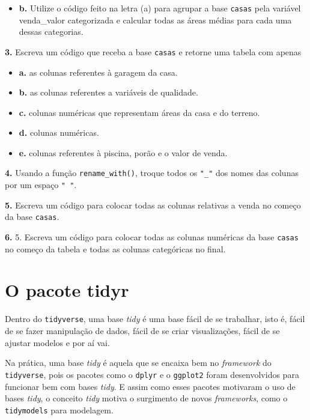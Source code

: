 \documentclass[
]{book}
\providecommand{\tightlist}{%
  \setlength{\itemsep}{0pt}\setlength{\parskip}{0pt}}
\begin{document}
\begin{itemize}
\tightlist
\item
  \textbf{b.} Utilize o código feito na letra (a) para agrupar a base \texttt{casas} pela variável venda\_valor categorizada e calcular todas as áreas médias para cada uma dessas categorias.
\end{itemize}

\textbf{3.} Escreva um código que receba a base \texttt{casas} e retorne uma tabela com apenas

\begin{itemize}
\item
  \textbf{a.} as colunas referentes à garagem da casa.
\item
  \textbf{b.} as colunas referentes a variáveis de qualidade.
\item
  \textbf{c.} colunas numéricas que representam áreas da casa e do terreno.
\item
  \textbf{d.} colunas numéricas.
\item
  \textbf{e.} colunas referentes à piscina, porão e o valor de venda.
\end{itemize}

\textbf{4.} Usando a função \texttt{rename\_with()}, troque todos os \texttt{"\_"} dos nomes das colunas por um espaço \texttt{"\ "}.

\textbf{5.} Escreva um código para colocar todas as colunas relativas a venda no começo da base \texttt{casas}.

\textbf{6.} 5. Escreva um código para colocar todas as colunas numéricas da base \texttt{casas} no começo da tabela e todas as colunas categóricas no final.

\hypertarget{tidyr}{%
\section{O pacote tidyr}\label{tidyr}}

Dentro do \texttt{tidyverse}, uma base \emph{tidy} é uma base fácil de se trabalhar, isto é, fácil de se fazer manipulação de dados, fácil de se criar visualizações, fácil de se ajustar modelos e por aí vai.

Na prática, uma base \emph{tidy} é aquela que se encaixa bem no \emph{framework} do \texttt{tidyverse}, pois os pacotes como o \texttt{dplyr} e o \texttt{ggplot2} foram desenvolvidos para funcionar bem com bases \emph{tidy}. E assim como esses pacotes motivaram o uso de bases \emph{tidy}, o conceito \emph{tidy} motiva o surgimento de novos \emph{frameworks}, como o \texttt{tidymodels} para modelagem.
\end{document}
